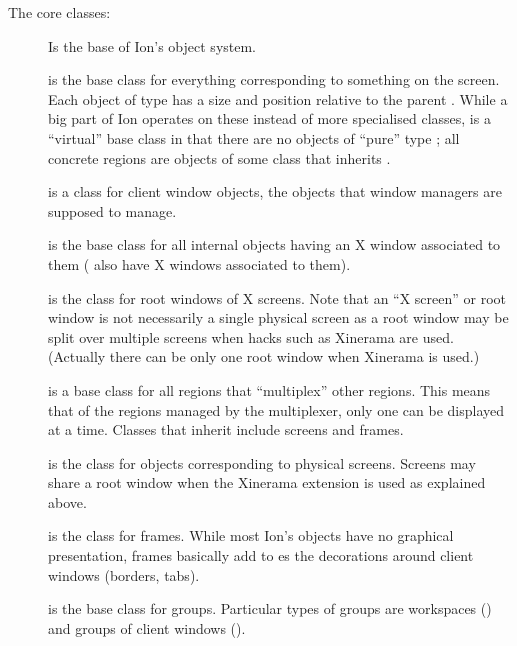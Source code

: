 The core classes:

\begin{description}
  \item[]
    Is the base of Ion's object system.

  \item[]
    is the base class for everything corresponding to something on the
    screen. Each object of type  has a size and  position
    relative to the parent . While a big part of Ion 
    operates on these instead of more specialised classes, 
    is a ``virtual''  base class in that there are no objects of ``pure''
    type ; all concrete regions are objects of some class 
    that inherits .

  \item[] is a class for
    client window objects, the objects that window managers are
    supposed to manage.

  \item[] is the base class for all
    internal objects having an X window associated to them
    ( also have X windows associated to them).
    
  \item[] is the class for
    root windows of X screens.
    Note that an ``X screen'' or root window is not necessarily a
    single  physical screen as a root window
    may be split over multiple screens when hacks such as 
    Xinerama are used. (Actually there can be only 
    one root window when Xinerama is used.)
    
  \item[] is a base class for all regions that ``multiplex'' 
    other regions. This means that of the regions managed by the multiplexer,
    only one can be displayed at a time. Classes that inherit 
    include screens and frames.
    
  \item[] is the class for objects
    corresponding to physical screens. Screens may share a root
    window when the Xinerama extension is used as explained above.

  \item[] is the class for frames.
    While most Ion's objects have no graphical presentation, frames basically
    add to es the decorations around client windows 
    (borders, tabs).
    
  \item[] is the base class for groups.
    Particular types of groups are workspaces 
    ()
    and groups of client windows
    ().
\end{description}



